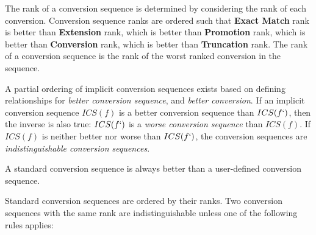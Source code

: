\p The rank of a conversion sequence is determined by considering the rank of
each conversion. Conversion sequence ranks are ordered such that \textbf{Exact
Match} rank is better than \textbf{Extension} rank, which is better than
\textbf{Promotion} rank, which is better than \textbf{Conversion} rank, which is
better than \textbf{Truncation} rank. The rank of a conversion sequence is the
rank of the worst ranked conversion in the sequence.



\p A partial ordering of implicit conversion sequences exists based on defining
relationships for \textit{better conversion sequence}, and \textit{better
conversion}. If an implicit conversion sequence \(ICS(f)\) is a better
conversion sequence than \(ICS(f`)\), then the inverse is also true: \(ICS(f`)\)
is a \textit{worse conversion sequence} than \(ICS(f)\). If \(ICS(f)\) is
neither better nor worse than \(ICS(f`)\), the conversion sequences are
\textit{indistinguishable conversion sequences}.

\p A standard conversion sequence is always better than a user-defined
conversion sequence.

\p Standard conversion sequences are ordered by their ranks. Two conversion
sequences with the same rank are indistinguishable unless one of the following
rules applies:

